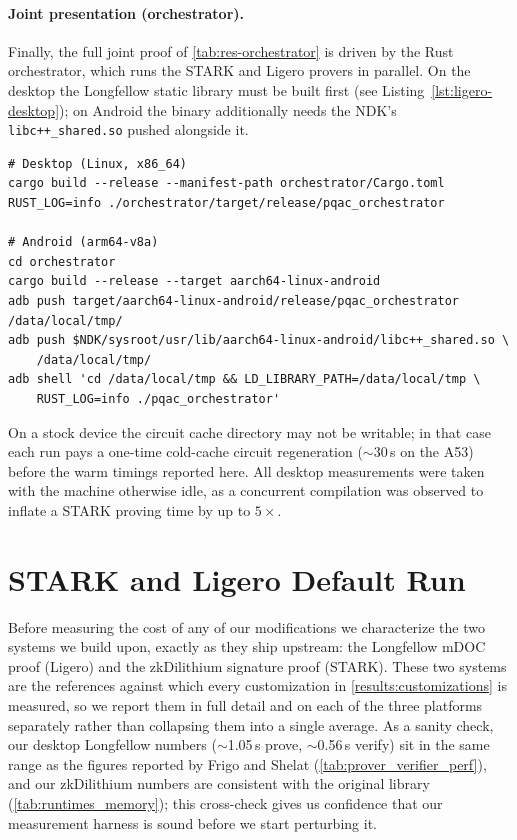 \documentclass[binding=0.6cm,oneside,noexaminfo]{sapthesis}
\begin{document}
\paragraph{Joint presentation (orchestrator).}
Finally, the full joint proof of \cref{tab:res-orchestrator} is driven by the
Rust orchestrator, which runs the STARK and Ligero provers in parallel. On the
desktop the Longfellow static library must be built first (see
Listing~\ref{lst:ligero-desktop}); on Android the binary additionally needs the
NDK's
\texttt{libc++\_shared.so} pushed alongside it.
\begin{lstlisting}[caption={Joint presentation (orchestrator, STARK${+}$Ligero in parallel): desktop and Android.},label={lst:orch}]
# Desktop (Linux, x86_64)
cargo build --release --manifest-path orchestrator/Cargo.toml
RUST_LOG=info ./orchestrator/target/release/pqac_orchestrator

# Android (arm64-v8a)
cd orchestrator
cargo build --release --target aarch64-linux-android
adb push target/aarch64-linux-android/release/pqac_orchestrator /data/local/tmp/
adb push $NDK/sysroot/usr/lib/aarch64-linux-android/libc++_shared.so \
    /data/local/tmp/
adb shell 'cd /data/local/tmp && LD_LIBRARY_PATH=/data/local/tmp \
    RUST_LOG=info ./pqac_orchestrator'
\end{lstlisting}
On a stock device the circuit cache directory may not be writable; in that case
each run pays a one-time cold-cache circuit regeneration (\(\sim\)30\,s on the
A53) before the warm timings reported here. All desktop measurements were taken
with the machine otherwise idle, as a concurrent compilation was observed to
inflate a STARK proving time by up to $5\times$.

\section{STARK and Ligero Default Run}
\label{results:baselines}
Before measuring the cost of any of our modifications we characterize the two
systems we build upon, exactly as they ship upstream: the Longfellow mDOC proof
(Ligero) and the zkDilithium signature proof (STARK). These two systems are the
references against which every customization in
\cref{results:customizations} is measured, so we report them in full detail and
on each of the three platforms separately rather than collapsing them into a
single average. As a sanity check, our desktop Longfellow numbers
($\sim$1.05\,s prove, $\sim$0.56\,s verify) sit in the same range as the figures
reported by Frigo and Shelat (\cref{tab:prover_verifier_perf}), and our
zkDilithium numbers are consistent with the original library
(\cref{tab:runtimes_memory}); this cross-check gives us confidence that our
measurement harness is sound before we start perturbing it.
\end{document}
